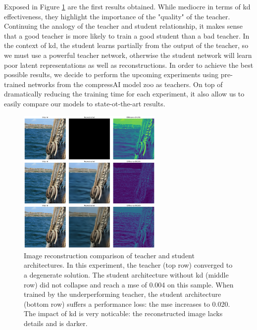 \documentclass{article}
\begin{document}
Exposed in Figure \ref{kd_ae_test_1} are the first results obtained. While mediocre in terms of \acrshort{kd} effectiveness, they highlight the importance of the "quality" of the teacher. Continuing the analogy of the teacher and student relationship, it makes sense that a good teacher is more likely to train a good student than a bad teacher. In the context of \acrshort{kd}, the student learns partially from the output of the teacher, so we must use a powerful teacher network, otherwise the student network will learn poor latent representations as well as reconstructions. In order to achieve the best possible results, we decide to perform the upcoming experiments using pre-trained networks from the compressAI model zoo as teachers. On top of dramatically reducing the training time for each experiment, it also allow us to easily compare our models to state-ot-the-art results.

\begin{figure}
    \centering
    \includegraphics[width=7cm]{../img/kd_ae_test_1.png}
    \caption[Image reconstruction comparison of teacher and student architectures.]{Image reconstruction comparison of teacher and student architectures. In this experiment, the teacher (top row) converged to a degenerate solution. The student architecture without \acrshort{kd} (middle row) did not collapse and reach a \acrshort{mse} of 0.004 on this sample. When trained by the underperforming teacher, the student architecture (bottom row) suffers a performance loss: the \acrshort{mse} increases to 0.020. The impact of \acrshort{kd} is very noticable: the reconstructed image lacks details and is darker.}
    \label{kd_ae_test_1}
\end{figure}
\end{document}

